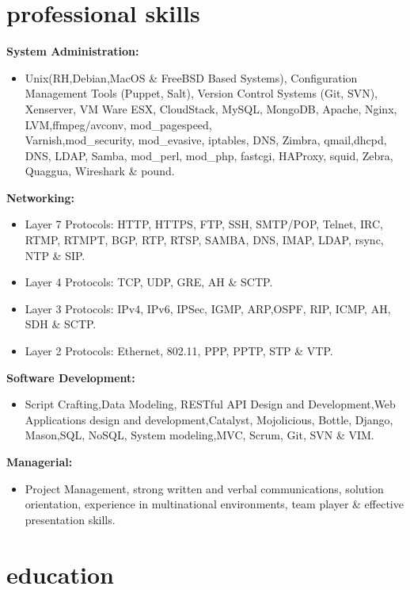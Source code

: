\documentclass[]{friggeri-cv} %
\begin{document}
\section{professional skills}
{\large \textbf{System Administration:}}
\begin{itemize}
\item Unix(RH,Debian,MacOS \& FreeBSD Based Systems), Configuration Management Tools (Puppet, Salt), Version Control Systems (Git, SVN), Xenserver, VM Ware ESX, CloudStack, MySQL, MongoDB, Apache, Nginx, LVM,ffmpeg/avconv, mod\_pagespeed, \\ 
Varnish,mod\_security, mod\_evasive, iptables, DNS, Zimbra, qmail,dhcpd, DNS, LDAP, Samba, mod\_perl, mod\_php, fastcgi, HAProxy, squid, Zebra, Quaggua, Wireshark \& pound.  
\end{itemize}
{\large \textbf{Networking:}}
\begin{itemize}
\item Layer 7 Protocols: HTTP, HTTPS, FTP, SSH, SMTP/POP, Telnet, IRC, RTMP, RTMPT, BGP, RTP, RTSP, SAMBA, DNS, IMAP, LDAP, rsync, NTP \& SIP. 
\item Layer 4 Protocols: TCP, UDP, GRE, AH \& SCTP.
\item Layer 3 Protocols: IPv4, IPv6, IPSec, IGMP, ARP,OSPF, RIP, ICMP, AH, SDH \& SCTP.
\item Layer 2 Protocols: Ethernet, 802.11, PPP, PPTP, STP \& VTP.
\end{itemize}
{\large \textbf{Software Development:}}
\begin{itemize}
\item Script Crafting,Data Modeling, RESTful API Design and Development,Web Applications design and development,Catalyst, Mojolicious, Bottle, Django, Mason,SQL, NoSQL, System modeling,MVC, Scrum, Git, SVN \& VIM.
\end{itemize}
{\large \textbf{Managerial:}}
\begin{itemize}
\item Project Management, strong written and verbal communications, solution orientation, experience in multinational environments, team player  \& effective presentation skills. 
\end{itemize}

\section{education}
\end{document}
